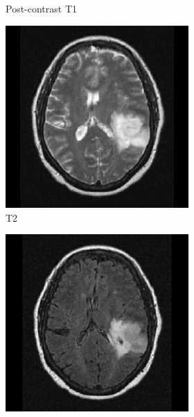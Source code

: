 \begin{subappendices}
\begin{figure}
\begin{subfigure}[b]{0.88\textwidth}
\begin{subfigure}[b]{0.24\textwidth}
        \caption*{Post-contrast \acrshort{T1}}
        \end{subfigure}
        \hfill
        \begin{subfigure}[b]{0.24\textwidth}
        \includegraphics[width=\textwidth]{Figures/TCGA-DU-6400_T2.png}
        \caption*{\acrshort{T2}}
        \end{subfigure}
        \hfill
        \begin{subfigure}[b]{0.24\textwidth}
        \includegraphics[width=\textwidth]{Figures/TCGA-DU-6400_FLAIR.png}

\end{subfigure}
\end{subfigure}
\end{figure}
\end{subappendices}
